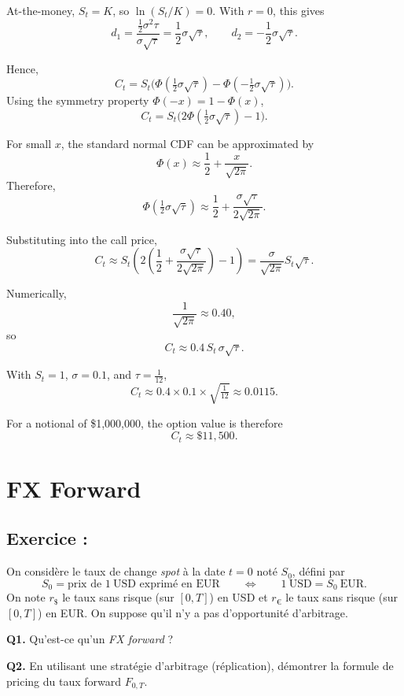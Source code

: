 At-the-money, \(S_t = K\), so \(\ln(S_t/K)=0\). With \(r=0\), this gives
\[
d_1 = \frac{\tfrac12\sigma^2\tau}{\sigma\sqrt{\tau}}
= \frac12\sigma\sqrt{\tau},
\qquad
d_2 = -\frac12\sigma\sqrt{\tau}.
\]

Hence,
\[
C_t = S_t\Big(\Phi(\tfrac12\sigma\sqrt{\tau}) - \Phi(-\tfrac12\sigma\sqrt{\tau})\Big).
\]
Using the symmetry property \(\Phi(-x)=1-\Phi(x)\),
\[
C_t = S_t\Big(2\Phi(\tfrac12\sigma\sqrt{\tau}) - 1\Big).
\]

For small \(x\), the standard normal CDF can be approximated by
\[
\Phi(x) \approx \frac12 + \frac{x}{\sqrt{2\pi}}.
\]
Therefore,
\[
\Phi\!\left(\tfrac12\sigma\sqrt{\tau}\right)
\approx \frac12 + \frac{\sigma\sqrt{\tau}}{2\sqrt{2\pi}}.
\]

Substituting into the call price,
\[
C_t \approx S_t \left(2\left(\frac12 + \frac{\sigma\sqrt{\tau}}{2\sqrt{2\pi}}\right) - 1\right)
= \frac{\sigma}{\sqrt{2\pi}} S_t \sqrt{\tau}.
\]

Numerically,
\[
\frac{1}{\sqrt{2\pi}} \approx 0.40,
\]
so
\[
\boxed{
C_t \approx 0.4\, S_t\, \sigma \sqrt{\tau}.
}
\]

With \(S_t=1\), \(\sigma=0.1\), and \(\tau=\tfrac{1}{12}\),
\[
C_t \approx 0.4 \times 0.1 \times \sqrt{\tfrac{1}{12}}
\approx 0.0115.
\]

For a notional of \$1{,}000{,}000, the option value is therefore
\[
\boxed{C_t \approx \$11{,}500.}
\]

\section{FX Forward}

\subsection*{Exercice :}

\begin{exerciseBox}
On considère le taux de change \emph{spot} à la date $t=0$ noté $S_0$, défini par
\[
S_0 = \text{prix de } 1~\mathrm{USD} \text{ exprimé en EUR}
\qquad\Longleftrightarrow\qquad
1~\mathrm{USD} = S_0~\mathrm{EUR}.
\]
On note $r_{\$}$ le taux sans risque (sur $[0,T]$) en USD et $r_{\euro}$ le taux sans risque (sur $[0,T]$) en EUR.
On suppose qu'il n'y a pas d'opportunité d'arbitrage.

\medskip
\noindent\textbf{Q1.} Qu'est-ce qu'un \emph{FX forward} ?

\smallskip
\noindent\textbf{Q2.} En utilisant une stratégie d'arbitrage (réplication), démontrer la formule de pricing du taux forward $F_{0,T}$.

\end{exerciseBox}

